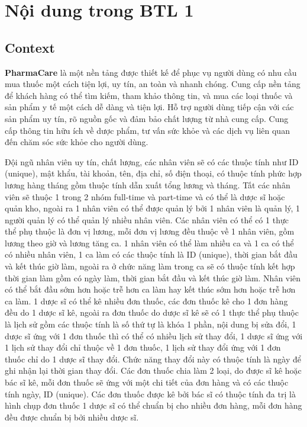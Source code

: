 \section{Nội dung trong BTL 1}
\subsection{Context}
\textbf{PharmaCare} là một nền tảng được thiết kế để phục vụ người dùng có nhu cầu mua thuốc một cách tiện lợi, uy tín, an toàn và nhanh chóng. Cung cấp nền tảng để khách hàng có thể tìm kiếm, tham khảo thông tin, và mua các loại thuốc và sản phẩm y tế một cách dễ dàng và tiện lợi. Hỗ trợ người dùng tiếp cận với các sản phẩm uy tín, rõ nguồn gốc và đảm bảo chất lượng từ nhà cung cấp. Cung cấp thông tin hữu ích về dược phẩm, tư vấn sức khỏe và các dịch vụ liên quan đến chăm sóc sức khỏe cho người dùng.

Đội ngũ nhân viên uy tín, chất lượng, các nhân viên sẽ có các thuộc tính như ID (unique), mật khẩu, tài khoản, tên, địa chỉ, số điện thoại, có thuộc tính phức hợp lương hàng tháng gồm thuộc tính dẫn xuất tổng lương và tháng. Tất các nhân viên sẽ thuộc 1 trong 2 nhóm full-time và part-time và có thể là dược sĩ hoặc quản kho, ngoài ra 1 nhân viên có thể được quản lý bởi 1 nhân viên là quản lý, 1 người quản lý có thể quản lý nhiều nhân viên. Các nhân viên có thể có 1 thực thể phụ thuộc là đơn vị lương, mỗi đơn vị lương đều thuộc về 1 nhân viên, gồm lương theo giờ và lương tăng ca. 1 nhân viên có thể làm nhiều ca và 1 ca có thể có nhiều nhân viên, 1 ca làm có các thuộc tính là ID (unique), thời gian bắt đầu và kết thúc giờ làm, ngoài ra ở chức năng làm trong ca sẽ có thuộc tính kết hợp thời gian làm gồm có ngày làm, thời gian bắt đầu và kết thúc giờ làm. Nhân viên có thể bắt đầu sớm hơn hoặc trễ hơn ca làm hay kết thúc sớm hơn hoặc trễ hơn ca làm. 1 dược sĩ có thể kê nhiều đơn thuốc, các đơn thuốc kê cho 1 đơn hàng đều do 1 dược sĩ kê, ngoài ra đơn thuốc do dược sĩ kê sẽ có 1 thực thể phụ thuộc là lịch sử gồm các thuộc tính là số thứ tự là khóa 1 phần, nội dung bị sửa đổi, 1 dược sĩ ứng với 1 đơn thuốc thì có thể có nhiều lịch sử thay đổi, 1 dược sĩ ứng với 1 lịch sử thay đổi chỉ thuộc về 1  đơn thuốc, 1  lịch sử thay đổi ứng với 1 đơn thuốc chỉ do 1 dược sĩ thay đổi. Chức năng thay đổi này có thuộc tính là ngày để ghi nhận lại thời gian thay đổi. Các đơn thuốc chia làm 2 loại, do được sĩ kê hoặc bác sĩ kê, mỗi đơn thuốc sẽ ứng với một chi tiết của đơn hàng và có các thuộc tính ngày, ID (unique). Các đơn thuốc được kê bởi bác sĩ có thuộc tính đa trị là hình chụp đơn thuốc 1 dược sĩ có thể chuẩn bị cho nhiều đơn hàng, mỗi đơn hàng đều được chuẩn bị bởi nhiều dược sĩ.

